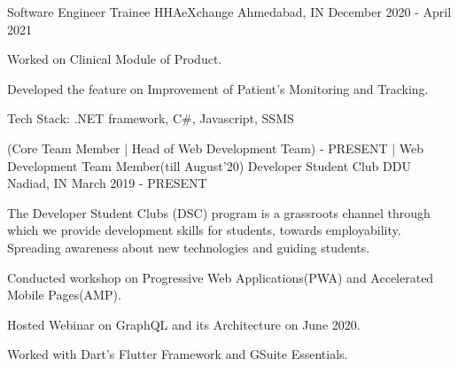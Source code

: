 
\begin{cventries}
  \cventry
    {Software Engineer Trainee} %
    {HHAeXchange} %
    {Ahmedabad, IN} %
    {December 2020 - April 2021} %
    {
      \begin{cvitems} %
        \item {Worked on Clinical Module of Product.}
        \item {Developed the feature on Improvement of Patient's Monitoring and Tracking.}
        \item {Tech Stack: .NET framework, C\#, Javascript, SSMS}
      \end{cvitems}
    }
  \cventry
    {(Core Team Member | Head of Web Development Team) - PRESENT | Web Development Team Member(till August'20)} %
    {Developer Student Club DDU} %
    {Nadiad, IN} %
    {March 2019 - PRESENT} %
    {
      \begin{cvitems} %
        \item {The Developer Student Clubs (DSC) program is a grassroots channel through which we provide development skills for students, towards employability. Spreading awareness about new technologies and guiding students.}
        \item{Conducted workshop on Progressive Web Applications(PWA) and Accelerated Mobile Pages(AMP).}
        \item{Hosted Webinar on GraphQL and its Architecture on June 2020.}
        \item{Worked with Dart's Flutter Framework and GSuite Essentials.}
      \end{cvitems}
    }

    
\end{cventries}
